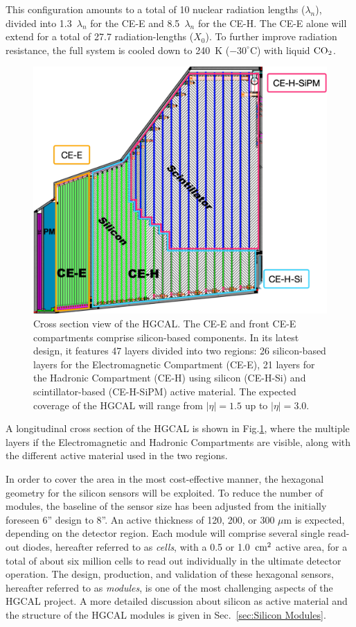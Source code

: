 This configuration amounts to a total of 10 nuclear radiation lengths ($\lambda_n$), divided into 1.3~$\lambda_n$ for the CE-E and 8.5~$\lambda_n$ for the CE-H. The CE-E alone will extend for a total of 27.7 radiation-lengths ($X_0$).
To further improve radiation resistance, the full system is cooled down to 240~K ($-30^{\circ}$C) with liquid $\textnormal{CO}_2$.

\begin{figure}
    \centering
    \includegraphics[width=0.6\linewidth]{Figures/HGCAL/HGCALLayers.pdf}
    \caption{Cross section view of the HGCAL. The CE-E and front CE-E compartments comprise silicon-based components. In its latest design, it features 47 layers divided into two regions: 26 silicon-based layers for the Electromagnetic Compartment (CE-E), 21 layers for the Hadronic Compartment (CE-H) using silicon (CE-H-Si) and scintillator-based (CE-H-SiPM) active material. The expected coverage of the HGCAL will range from $|\eta|=1.5$ up to $|\eta|=3.0$.}
    \label{fig:HGCALLayers}
\end{figure}

A longitudinal cross section of the HGCAL is shown in Fig.\ref{fig:HGCALLayers}, where the multiple layers if the Electromagnetic and Hadronic Compartments are visible, along with the different active material used in the two regions.

\bigbreak

In order to cover the area in the most cost-effective manner, the hexagonal geometry for the silicon sensors will be exploited. To reduce the number of modules, the baseline of the sensor size has been adjusted from the initially foreseen 6\mbox{''} design to 8\mbox{''}. An active thickness of 120, 200, or 300 $\mu$m is expected, depending on the detector region.
Each module will comprise several single read-out diodes, hereafter referred to as \textit{cells}, with a 0.5 or 1.0~$\textnormal{cm}^2$ active area, for a total of about six million cells to read out individually in the ultimate detector operation. 
The design, production, and validation of these hexagonal sensors, hereafter referred to as \textit{modules}, is one of the most challenging aspects of the HGCAL project. A more detailed discussion about silicon as active material and the structure of the HGCAL modules is given in Sec.~\ref{sec:Silicon Modules}. 

